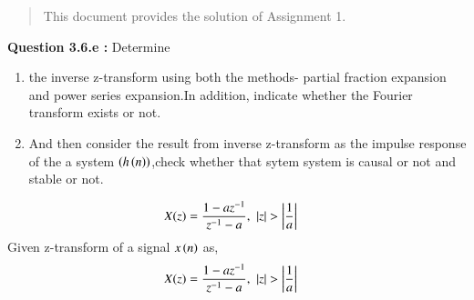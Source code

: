 \documentclass[journal,12pt,twocolumn]{IEEEtran}
\begin{document}
\begin{abstract}
This document provides the solution of Assignment 1.
\end{abstract}
\textbf{Question 3.6.e :} Determine 
\begin{enumerate}
	\item the inverse z-transform using both the methods- partial fraction expansion and power series expansion.In addition, indicate whether the Fourier transform exists or not. 
	\item And then consider the result from inverse z-transform as the impulse response of the a system $\left(h\left(n\right)\right)$,check whether that sytem system is causal or not and stable or not.
 \end{enumerate}
  \begin{align}
    X(z) &= \frac{1-az^{-1}}{z^{-1} - a} , \, \, \left\vert z\right\vert > \left\vert\frac{1}{a}\right\vert
  \end{align}
 \solution Given z-transform of a signal $x\left(n\right)$ as,
   \begin{align}
     X(z) &= \frac{1-az^{-1}}{z^{-1} - a} , \, \, \left\vert z\right\vert > \left\vert\frac{1}{a}\right\vert\label{eq:z-transform}
   \end{align}
\end{document}
